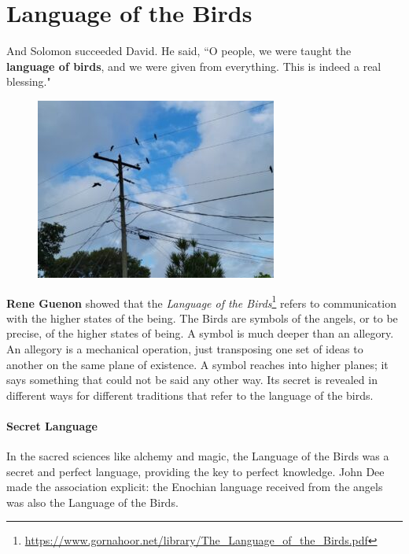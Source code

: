 \section{Language of the Birds}

\begin{quotex}
And Solomon succeeded David. He said, ``O people, we were taught the \textbf{language of birds}, and we were given from everything. This is indeed a real blessing." 

\end{quotex}

\begin{figure}
 \includegraphics[scale=.5]{a20220508LanguageoftheBirds-img001.jpg} 
\end{figure}

\textbf{Rene Guenon} showed that the \textit{Language of the Birds}\footnote{\url{https://www.gornahoor.net/library/The_Language_of_the_Birds.pdf}} refers to communication with the higher states of the being. The Birds are symbols of the angels, or to be precise, of the higher states of being. A symbol is much deeper than an allegory. An allegory is a mechanical operation, just transposing one set of ideas to another on the same plane of existence. A symbol reaches into higher planes; it says something that could not be said any other way. Its secret is revealed in different ways for different traditions that refer to the language of the birds.

\paragraph{Secret Language}
In the sacred sciences like alchemy and magic, the Language of the Birds was a secret and perfect language, providing the key to perfect knowledge. John Dee made the association explicit: the Enochian language received from the angels was also the Language of the Birds.

